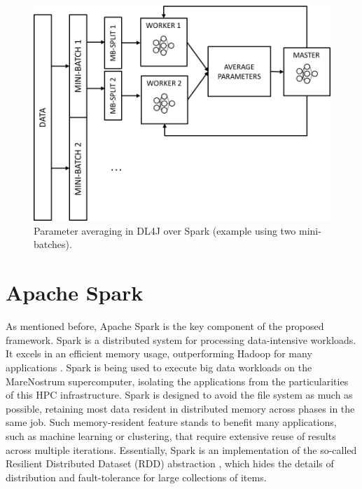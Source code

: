 \documentclass[journal]{IEEEtran}
\begin{document}
\begin{figure}
\begin{center}
\centerline{\includegraphics[width=1.0\linewidth]{img/distributed.png}}
\caption{Parameter averaging in DL4J over Spark (example using two mini-batches).}
\label{fig:dl4j}
\end{center}
\vspace{-0.5cm}
\end{figure}


\section{Apache Spark}
\label{sec:spark}

As mentioned before, Apache Spark is the key component of the proposed framework. Spark is a distributed system for processing data-intensive workloads. It excels in an efficient memory usage, outperforming Hadoop for many applications \cite{zaharia2012}. Spark is being used to execute big data workloads on the MareNostrum supercomputer, isolating the applications from the particularities of this HPC infrastructure. Spark is designed to avoid the file system as much as possible, retaining most data resident in distributed memory across phases in the same job. Such memory-resident feature stands to benefit many applications, such as machine learning or clustering, that require extensive reuse of results across multiple iterations.
Essentially, Spark is an implementation of the so-called Resilient Distributed Dataset (RDD) abstraction \cite{zaharia2012}, which hides the details of distribution and fault-tolerance for large collections of items.
\end{document}
